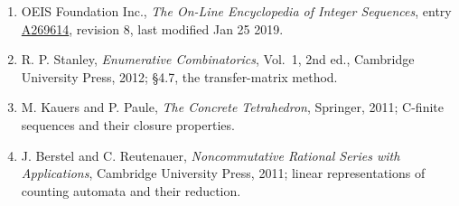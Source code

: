 \documentclass[11pt]{article}
\theoremstyle{definition}
\begin{document}
\begin{enumerate}

\item OEIS Foundation Inc., \emph{The On-Line Encyclopedia of Integer Sequences}, entry \href{https://oeis.org/A269614}{A269614}, revision 8, last modified Jan 25 2019.

\item R. P. Stanley, \emph{Enumerative Combinatorics}, Vol.~1, 2nd ed., Cambridge University Press, 2012; \S4.7, the transfer-matrix method.

\item M. Kauers and P. Paule, \emph{The Concrete Tetrahedron}, Springer, 2011; C-finite sequences and their closure properties.

\item J. Berstel and C. Reutenauer, \emph{Noncommutative Rational Series with Applications}, Cambridge University Press, 2011; linear representations of counting automata and their reduction.

\end{enumerate}
\end{document}
